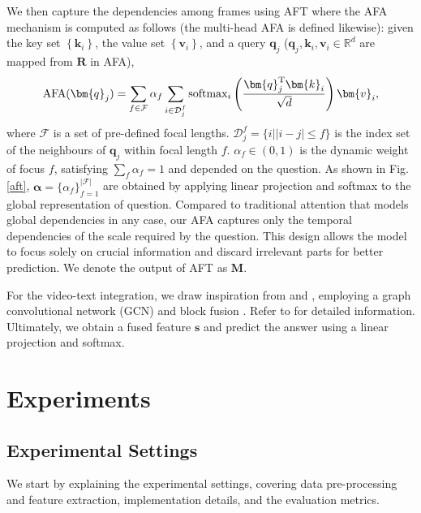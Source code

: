 {We then  capture the dependencies among frames using AFT where the AFA mechanism
is computed as follows (the multi-head AFA is defined likewise): given the key set $\left\{\bm{k}_i\right\}$, the value set $\left\{\bm{v}_i\right\}$, and a query $\bm{q}_j$ ($\bm{q}_j,\bm{k}_i,\bm{v}_i \in \mathbb{R}^d$ are mapped from $\bm{R}$ in AFA), 
\begin{equation}
{\rm AFA}(\bm{q}_j)=\sum_{f\in \mathcal{F}}\alpha_f\sum_{i\in \mathcal{D}_j^f}{\rm softmax}_i\left(\frac{\bm{q}_j^\mathrm{T}\bm{k}_i}{\sqrt{d}}\right)\bm{v}_i,
\end{equation}
where $\mathcal{F}$ is a set of pre-defined focal lengths. $\mathcal{D}_j^f=\{i||i-j|\leq f\}$ is the index set of the neighbours of $\bm{q}_j$ within focal length $f$. $\alpha_f\in(0,1)$ is the dynamic weight of focus $f$, satisfying $\sum_f\alpha_f=1$ and depended on the question. As shown in Fig. \ref{aft},   $\bm{\alpha}=\{\alpha_f\}_{f=1}^\mathcal{|F|}$ are obtained by applying linear projection and softmax to the global representation of question.  
Compared to traditional attention that models global dependencies in any case, our AFA captures only the temporal dependencies of the scale required by the question. This design allows the model to focus solely on crucial information and discard irrelevant parts for better prediction. 
We denote the output of AFT as $\bm{M}$.

For the video-text integration, we draw inspiration from \citep{li2022invariant} and \citep{jiang2020reasoning}, employing a graph convolutional network (GCN) and block fusion \citep{ben2019block}. Refer to \citep{li2022invariant} for detailed information. Ultimately, we obtain a fused feature $\bm{s}$ and predict the answer using a linear projection and softmax.




\section{Experiments}
 


 
\subsection{Experimental Settings}
\label{feaext}

We start by explaining the experimental settings, covering data pre-processing and feature extraction, implementation details, and the evaluation metrics.

}
